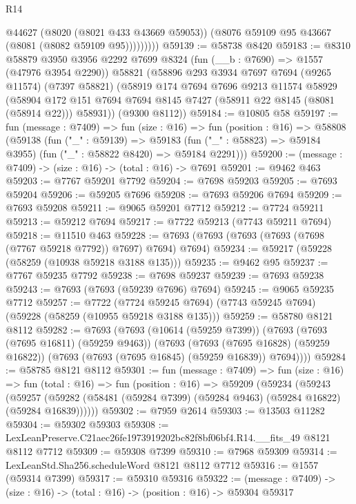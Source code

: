 \begin{lexlean}{R14}
\begin{coremodule}
                @44627
                (@8020 (@8021 @433 @43669 @59053))
                (@8076 @59109 @95 @43667 (@8081 (@8082 @59109 @95)))))))))
@59139 := @58738 @8420
@59183 := @8310
    @58879
    @3950
    @3956
    @2292
    @7699
    @8324
    (fun (__b : @7690) => @1557 (@47976 @3954 @2290))
    @58821
    (@58896
      @293
      @3934
      @7697
      @7694
      (@9265 @11574)
      (@7397 @58821)
      (@58919
        @174
        @7694
        @7696
        @9213
        @11574
        @58929
        (@58904 @172 @151 @7694 @7694 @8145 @7427 (@58911 @22 @8145 (@8081 (@58914 @22))) @58931))
      (@9300 @8112))
@59184 := @10805 @58
@59197 := fun (message : @7409) =>
  fun (size : @16) =>
  fun (position : @16) =>
  @58808
    (@59138
      (fun ("_" : @59139) =>
      @59183 (fun ("_" : @58823) => @59184 @3955) (fun ("_" : @58822 @8420) => @59184 @2291)))
@59200 := (message : @7409) -> (size : @16) -> (total : @16) -> @7691
@59201 := @9462 @463
@59203 := @7767 @59201 @7792
@59204 := @7698 @59203
@59205 := @7693 @59204
@59206 := @59205 @7696
@59208 := @7693 @59206 @7694
@59209 := @7693 @59208
@59211 := @9065 @59201 @7712
@59212 := @7724 @59211
@59213 := @59212 @7694
@59217 := @7722 @59213 (@7743 @59211 @7694)
@59218 := @11510 @463
@59228 := @7693 (@7693 (@7693 (@7693 (@7698 (@7767 @59218 @7792)) @7697) @7694) @7694)
@59234 := @59217 (@59228 (@58259 (@10938 @59218 @3188 @135)))
@59235 := @9462 @95
@59237 := @7767 @59235 @7792
@59238 := @7698 @59237
@59239 := @7693 @59238
@59243 := @7693 (@7693 (@59239 @7696) @7694)
@59245 := @9065 @59235 @7712
@59257 := @7722
    (@7724 @59245 @7694)
    (@7743 @59245 @7694)
    (@59228 (@58259 (@10955 @59218 @3188 @135)))
@59259 := @58780 @8121 @8112
@59282 := @7693
    (@7693
      (@10614 (@59259 @7399))
      (@7693
        (@7693 (@7695 @16811) (@59259 @9463))
        (@7693
          (@7693 (@7695 @16828) (@59259 @16822))
          (@7693 (@7693 (@7695 @16845) (@59259 @16839)) @7694))))
@59284 := @58785 @8121 @8112
@59301 := fun (message : @7409) =>
  fun (size : @16) =>
  fun (total : @16) =>
  fun (position : @16) =>
  @59209
    (@59234
      (@59243
        (@59257 (@59282 (@58481 (@59284 @7399) (@59284 @9463) (@59284 @16822) (@59284 @16839))))))
@59302 := @7959 @2614
@59303 := @13503 @11282
@59304 := @59302 @59303
@59308 := LexLeanPreserve.C21aec26fe1973919202bc82f8bf06bf4.R14.__fits_49 @8121 @8112 @7712
@59309 := @59308 @7399
@59310 := @7968 @59309
@59314 := LexLeanStd.Sha256.scheduleWord @8121 @8112 @7712
@59316 := @1557 (@59314 @7399)
@59317 := @59310 @59316
@59322 := (message : @7409) -> (size : @16) -> (total : @16) -> (position : @16) -> @59304 @59317

\end{coremodule}
\end{lexlean}
